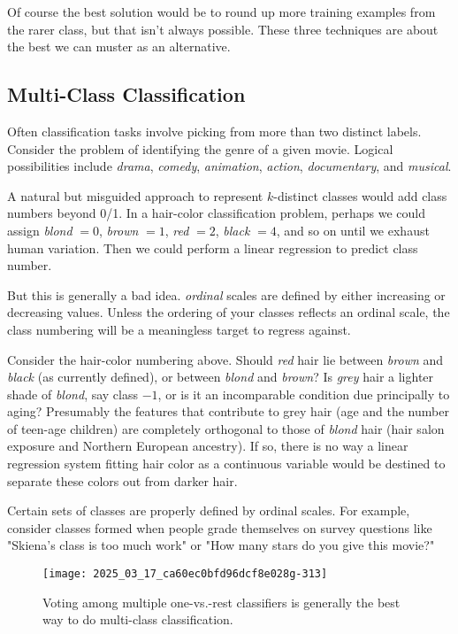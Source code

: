 \documentclass[10pt]{article}
\begin{document}
Of course the best solution would be to round up more training examples from the rarer class, but that isn't always possible. These three techniques are about the best we can muster as an alternative.

\subsection{Multi-Class Classification}
Often classification tasks involve picking from more than two distinct labels. Consider the problem of identifying the genre of a given movie. Logical possibilities include \emph{drama}, \emph{comedy}, \emph{animation}, \emph{action}, \emph{documentary}, and \emph{musical}.

A natural but misguided approach to represent \(k\)-distinct classes would add class numbers beyond 0/1. In a hair-color classification problem, perhaps we could assign \emph{blond} \(=0\), \emph{brown} \(=1\), \emph{red} \(=2\), \emph{black} \(=4\), and so on until we exhaust human variation. Then we could perform a linear regression to predict class number.

But this is generally a bad idea. \emph{ordinal} scales are defined by either increasing or decreasing values. Unless the ordering of your classes reflects an ordinal scale, the class numbering will be a meaningless target to regress against.

Consider the hair-color numbering above. Should \emph{red} hair lie between \emph{brown} and \emph{black} (as currently defined), or between \emph{blond} and \emph{brown}? Is \emph{grey} hair a lighter shade of \emph{blond}, say class \(-1\), or is it an incomparable condition due principally to aging? Presumably the features that contribute to grey hair (age and the number of teen-age children) are completely orthogonal to those of \emph{blond} hair (hair salon exposure and Northern European ancestry). If so, there is no way a linear regression system fitting hair color as a continuous variable would be destined to separate these colors out from darker hair.

Certain sets of classes are properly defined by ordinal scales. For example, consider classes formed when people grade themselves on survey questions like "Skiena's class is too much work" or "How many stars do you give this movie?"

\begin{figure}[h]
    \centering
    \texttt{[image: 2025\_03\_17\_ca60ec0bfd96dcf8e028g-313]}
    \caption{Voting among multiple one-vs.-rest classifiers is generally the best way to do multi-class classification.}
\end{figure}
\end{document}
